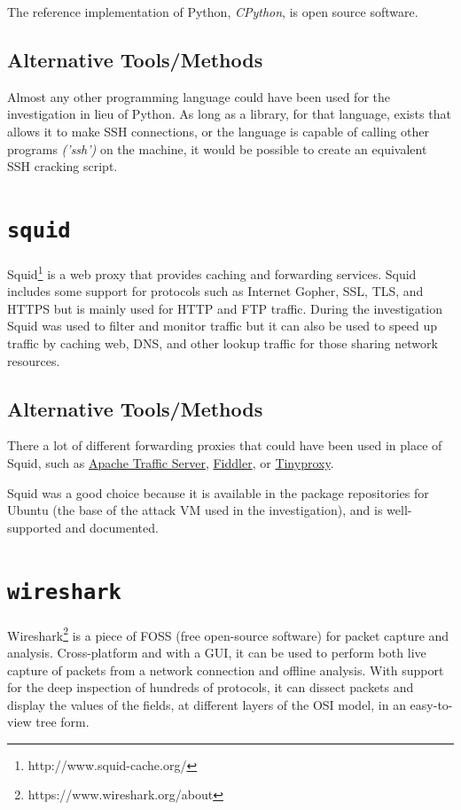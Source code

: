 \documentclass[12pt]{report}
\begin{document}
The reference implementation of Python, \textit{CPython}, is open source software.
\subsection*{Alternative Tools/Methods}
Almost any other programming language could have been used for the investigation in lieu of Python. As long as a library, for that language, exists that allows it to make SSH connections, or the language is capable of calling other programs \textit{('ssh')} on the machine, it would be possible to create an equivalent SSH cracking script.

\section{\texttt{squid}}
Squid\footnote{http://www.squid-cache.org/} is a web proxy that provides caching and forwarding services. Squid includes some support for protocols such as Internet Gopher, SSL, TLS, and HTTPS but is mainly used for HTTP and FTP traffic. During the investigation Squid was used to filter and monitor traffic but it can also be used to speed up traffic by caching web, DNS, and other lookup traffic for those sharing network resources.
\subsection*{Alternative Tools/Methods}
There a lot of different forwarding proxies that could have been used in place of Squid, such as \href{https://docs.trafficserver.apache.org/en/5.3.x/admin/forward-proxy.en.html}{Apache Traffic Server}, \href{https://www.telerik.com/fiddler}{Fiddler}, or \href{https://tinyproxy.github.io/}{Tinyproxy}.

Squid was a good choice because it is available in the package repositories for Ubuntu (the base of the attack VM used in the investigation), and is well-supported and documented.

\section{\texttt{wireshark}}
Wireshark\footnote{https://www.wireshark.org/about} is a piece of FOSS (free open-source software) for packet capture and analysis. Cross-platform and with a GUI, it can be used to perform both live capture of packets from a network connection and offline analysis. With support for the deep inspection of hundreds of protocols, it can dissect packets and display the values of the fields, at different layers of the OSI model, in an easy-to-view tree form.
\end{document}
